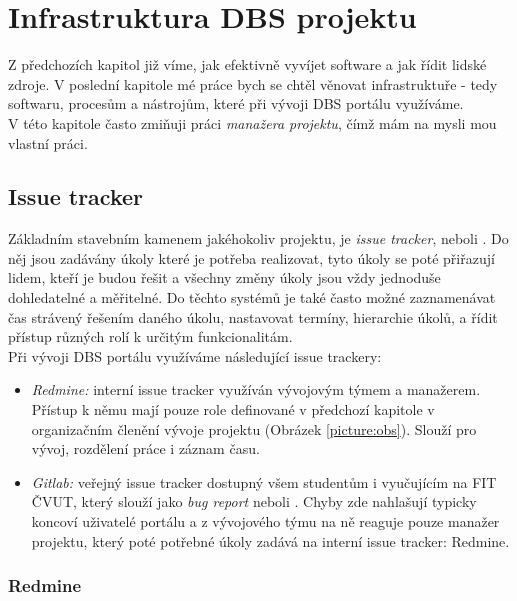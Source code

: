 \chapter{Infrastruktura DBS projektu} \label{infrastructure}

Z předchozích kapitol již víme, jak efektivně vyvíjet software a jak řídit lidské zdroje. V poslední kapitole mé práce bych se chtěl věnovat infrastruktuře - tedy softwaru, procesům a nástrojům, které při vývoji DBS portálu využíváme.\\
V této kapitole často zmiňuji práci \emph{manažera projektu}, čímž mám na mysli mou vlastní práci.


\section{Issue tracker}

Základním stavebním kamenem jakéhokoliv projektu, je \emph{issue tracker}, neboli . Do něj jsou zadávány úkoly které je potřeba realizovat, tyto úkoly se poté přiřazují lidem, kteří je budou řešit a všechny změny úkoly jsou vždy jednoduše dohledatelné a měřitelné. Do těchto systémů je také často možné zaznamenávat čas strávený řešením daného úkolu, nastavovat termíny, hierarchie úkolů, a řídit přístup různých rolí k určitým funkcionalitám.\\
Při vývoji DBS portálu využíváme následující issue trackery:
\begin{itemize}
	\item \emph{Redmine:} interní issue tracker využíván vývojovým týmem a manažerem. Přístup k němu mají pouze role definované v předchozí kapitole v organizačním členění vývoje projektu (Obrázek \ref{picture:obs}). Slouží pro vývoj, rozdělení práce i záznam času.
	\item \emph{Gitlab:} veřejný issue tracker dostupný všem studentům i vyučujícím na FIT ČVUT, který slouží jako \emph{bug report} neboli . Chyby zde nahlašují typicky koncoví uživatelé portálu a z vývojového týmu na ně reaguje pouze manažer projektu, který poté potřebné úkoly zadává na interní issue tracker: Redmine.
\end{itemize}

\subsection{Redmine} \label{if:redmine}

